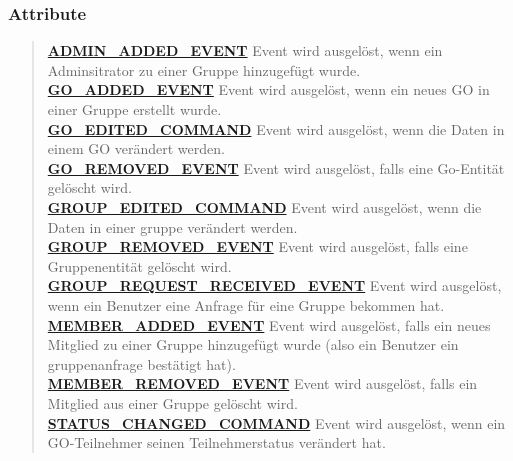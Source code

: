 \documentclass[11pt,a4paper]{article}
\begin{document}
{{{{{{{{{{{{{{\subsubsection{Attribute}{
\begin{verse}
\hyperlink{edu.kit.pse17.go_app.ClientCommunication.Downstream.EventArg.ADMIN_ADDED_EVENT}{{\bf ADMIN\_ADDED\_EVENT}} Event wird ausgelöst, wenn ein Adminsitrator zu einer Gruppe hinzugefügt wurde.\\
\hyperlink{edu.kit.pse17.go_app.ClientCommunication.Downstream.EventArg.GO_ADDED_EVENT}{{\bf GO\_ADDED\_EVENT}} Event wird ausgelöst, wenn ein neues GO in einer Gruppe erstellt wurde.\\
\hyperlink{edu.kit.pse17.go_app.ClientCommunication.Downstream.EventArg.GO_EDITED_COMMAND}{{\bf GO\_EDITED\_COMMAND}} Event wird ausgelöst, wenn die Daten in einem GO verändert werden.\\
\hyperlink{edu.kit.pse17.go_app.ClientCommunication.Downstream.EventArg.GO_REMOVED_EVENT}{{\bf GO\_REMOVED\_EVENT}} Event wird ausgelöst, falls eine Go-Entität gelöscht wird.\\
\hyperlink{edu.kit.pse17.go_app.ClientCommunication.Downstream.EventArg.GROUP_EDITED_COMMAND}{{\bf GROUP\_EDITED\_COMMAND}} Event wird ausgelöst, wenn die Daten in einer gruppe verändert werden.\\
\hyperlink{edu.kit.pse17.go_app.ClientCommunication.Downstream.EventArg.GROUP_REMOVED_EVENT}{{\bf GROUP\_REMOVED\_EVENT}} Event wird ausgelöst, falls eine Gruppenentität gelöscht wird.\\
\hyperlink{edu.kit.pse17.go_app.ClientCommunication.Downstream.EventArg.GROUP_REQUEST_RECEIVED_EVENT}{{\bf GROUP\_REQUEST\_RECEIVED\_EVENT}} Event wird ausgelöst, wenn ein Benutzer eine Anfrage für eine Gruppe bekommen hat.\\
\hyperlink{edu.kit.pse17.go_app.ClientCommunication.Downstream.EventArg.MEMBER_ADDED_EVENT}{{\bf MEMBER\_ADDED\_EVENT}} Event wird ausgelöst, falls ein neues Mitglied zu einer Gruppe hinzugefügt wurde (also ein Benutzer ein gruppenanfrage bestätigt hat).\\
\hyperlink{edu.kit.pse17.go_app.ClientCommunication.Downstream.EventArg.MEMBER_REMOVED_EVENT}{{\bf MEMBER\_REMOVED\_EVENT}} Event wird ausgelöst, falls ein Mitglied aus einer Gruppe gelöscht wird.\\
\hyperlink{edu.kit.pse17.go_app.ClientCommunication.Downstream.EventArg.STATUS_CHANGED_COMMAND}{{\bf STATUS\_CHANGED\_COMMAND}} Event wird ausgelöst, wenn ein GO-Teilnehmer seinen Teilnehmerstatus verändert hat.\\
\end{verse}
}
}}}}}}}}}}}}}}
\end{document}
